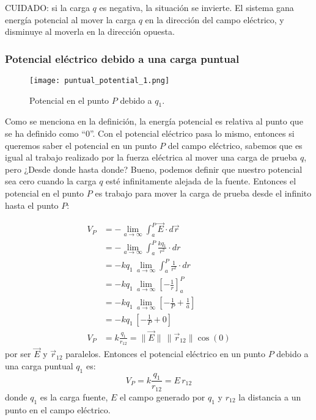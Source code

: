 \begin{tcolorbox}[mydanger]
    CUIDADO: si la carga \(q\) es negativa, la situación se invierte. El sistema gana energía potencial al mover la carga \(q\) en la dirección del campo eléctrico, y disminuye al moverla en la dirección opuesta.    
\end{tcolorbox}

\subsubsection{Potencial eléctrico debido a una carga puntual}

\begin{wrapfigure}{l}{0.32\textwidth}
    \centering
    \texttt{[image: puntual\_potential\_1.png]}
    \caption{Potencial en el punto \(P\) debido a \(q_1\).}
    \label{fig:potential_point_charge}
\end{wrapfigure}
Como se menciona en la definición, la energía potencial es relativa al punto que se ha definido como ``0''. Con  el potencial eléctrico pasa lo mismo, entonces si queremos saber el potencial en un punto \(P\) del campo eléctrico, sabemos que es igual al trabajo realizado por la fuerza eléctrica al mover una carga de prueba \(q\), pero ¿Desde donde hasta donde? Bueno, podemos definir que nuestro potencial sea cero cuando la carga \(q\) esté infinitamente alejada de la fuente. Entonces el potencial en el punto \(P\) es trabajo para mover la carga de prueba desde el infinito hasta el punto \(P\):

\clearpage

\begin{align*}
    V_P &= - \lim_{a \to \infty}\int_{a}^P \vec{E} \cdot d\vec{r}\\
        &= - \lim_{a \to \infty}\int_{a}^P \frac{kq_1}{r^2} \cdot dr\\
        &= -kq_1 \, \lim_{a \to \infty} \int_{a}^P \frac{1}{r^2} \cdot dr\\
        &= -kq_1 \, \lim_{a \to \infty} \left[ -\frac{1}{r} \right]_{a}^P\\
        &= -kq_1 \, \lim_{a \to \infty} \left[ -\frac{1}{P} + \frac{1}{a} \right]\\
        &= -kq_1 \, \left[ -\frac{1}{P} + 0 \right] \\
    V_P &= k\frac{q_1}{r_{12}} = \lVert\vec{E}\rVert \, \lVert\vec{r}_{12}\rVert \cos(0)
\end{align*}
por ser \(\vec{E}\) y \(\vec{r}_{12}\) paralelos. Entonces el potencial eléctrico en un punto \(P\) debido a una carga puntual \(q_1\) es:
\begin{equation}
    \boxed{V_P = k\frac{q_1}{r_{12}} = E \, r_{12}}
    \label{eq:potential_point_charge}
\end{equation}
donde \(q_1\) es la carga fuente, \(E\) el campo generado por \(q_1\) y \(r_{12}\) la distancia a un punto en el campo eléctrico.

